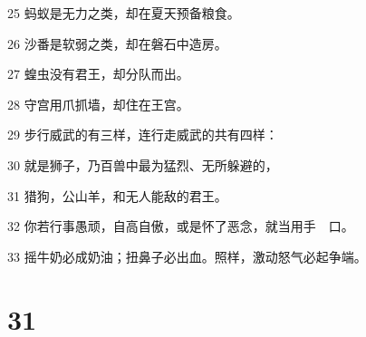 \par 25 蚂蚁是无力之类，却在夏天预备粮食。
\par 26 沙番是软弱之类，却在磐石中造房。
\par 27 蝗虫没有君王，却分队而出。
\par 28 守宫用爪抓墙，却住在王宫。
\par 29 步行威武的有三样，连行走威武的共有四样：
\par 30 就是狮子，乃百兽中最为猛烈、无所躲避的，
\par 31 猎狗，公山羊，和无人能敌的君王。
\par 32 你若行事愚顽，自高自傲，或是怀了恶念，就当用手　口。
\par 33 摇牛奶必成奶油；扭鼻子必出血。照样，激动怒气必起争端。

\chapter{31}

